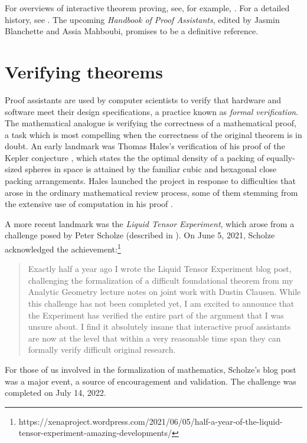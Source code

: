 \documentclass[12pt]{amsart}
\theoremstyle{definition}
\theoremstyle{remark}
\numberwithin{equation}{section}
\begin{document}
For overviews of interactive theorem proving, see, for example, \cite{avigad:harrison:14,buzzard:20,hales:15}. For a detailed history, see \cite{harrison:urban:wiedijk:14}. The upcoming \emph{Handbook of Proof Assistants}, edited by Jasmin Blanchette and Assia Mahboubi, promises to be a definitive reference.


\section{Verifying theorems}

Proof assistants are used by computer scientists to verify that hardware and software meet their design specifications, a practice known as \emph{formal verification}. The mathematical analogue is verifying the correctness of a mathematical proof, a task which is most compelling when the correctness of the original theorem is in doubt. An early landmark was Thomas Hales's verification of his proof of the Kepler conjecture \cite{hales:05}, which states the the optimal density of a packing of equally-sized spheres in space is attained by the familiar cubic and hexagonal close packing arrangements. Hales launched the project in response to difficulties that arose in the ordinary mathematical review process, some of them stemming from the extensive use of computation in his proof \cite{hales:et:al:17}.

A more recent landmark was the \emph{Liquid Tensor Experiment}, which arose from a challenge posed by Peter Scholze (described in \cite{castelvecchi:21}).
On June 5, 2021, Scholze acknowledged the achievement:\footnote{{https://xenaproject.wordpress.com/2021/06/05/half-a-year-of-the-liquid-tensor-experiment-amazing-developments/}}
\begin{quote}
Exactly half a year ago I wrote the Liquid Tensor Experiment blog post, challenging the formalization of a difficult foundational theorem from my Analytic Geometry lecture notes on joint work with Dustin Clausen. While this challenge has not been completed yet, I am excited to announce that the Experiment has verified the entire part of the argument that I was unsure about. I find it absolutely insane that interactive proof assistants are now at the level that within a very reasonable time span they can formally verify difficult original research.
\end{quote}
For those of us involved in the formalization of mathematics, Scholze's blog post was a major event, a source of encouragement and validation. The challenge was completed on July 14, 2022.
\end{document}
